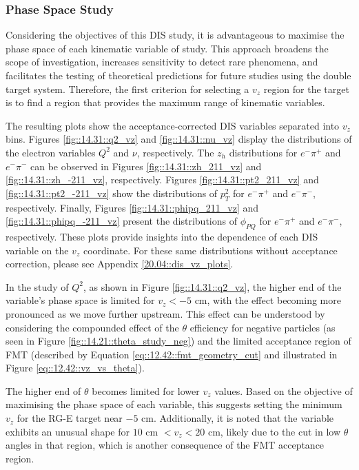 \subsubsection{Phase Space Study}
\label{14.31::phase_space_study}
    Considering the objectives of this DIS study, it is advantageous to maximise the phase space of each kinematic variable of study.
    This approach broadens the scope of investigation, increases sensitivity to detect rare phenomena, and facilitates the testing of theoretical predictions for future studies using the double target system.
    Therefore, the first criterion for selecting a $v_z$ region for the target is to find a region that provides the maximum range of kinematic variables.

    The resulting plots show the acceptance-corrected DIS variables separated into $v_z$ bins.
    Figures \ref{fig::14.31::q2_vz} and \ref{fig::14.31::nu_vz} display the distributions of the electron variables $Q^2$ and $\nu$, respectively.
    The $z_h$ distributions for $e^-\pi^+$ and $e^-\pi^-$ can be observed in Figures \ref{fig::14.31::zh_211_vz} and \ref{fig::14.31::zh_-211_vz}, respectively.
    Figures \ref{fig::14.31::pt2_211_vz} and \ref{fig::14.31::pt2_-211_vz} show the distributions of $p_T^2$ for $e^-\pi^+$ and $e^-\pi^-$, respectively.
    Finally, Figures \ref{fig::14.31::phipq_211_vz} and \ref{fig::14.31::phipq_-211_vz} present the distributions of $\phi_{PQ}$ for $e^-\pi^+$ and $e^-\pi^-$, respectively.
    These plots provide insights into the dependence of each DIS variable on the $v_z$ coordinate.
    For these same distributions without acceptance correction, please see Appendix \ref{20.04::dis_vz_plots}.

    In the study of $Q^2$, as shown in Figure \ref{fig::14.31::q2_vz}, the higher end of the variable's phase space is limited for $v_z < -5$ cm, with the effect becoming more pronounced as we move further upstream.
    This effect can be understood by considering the compounded effect of the $\theta$ efficiency for negative particles (as seen in Figure \ref{fig::14.21::theta_study_neg}) and the limited acceptance region of FMT (described by Equation \eqref{eq::12.42::fmt_geometry_cut} and illustrated in Figure \ref{eq::12.42::vz_vs_theta}).

    The higher end of $\theta$ becomes limited for lower $v_z$ values.
    Based on the objective of maximising the phase space of each variable, this suggests setting the minimum $v_z$ for the RG-E target near $-5$ cm.
    Additionally, it is noted that the variable exhibits an unusual shape for $10$ cm $< v_z < 20$ cm, likely due to the cut in low $\theta$ angles in that region, which is another consequence of the FMT acceptance region.

